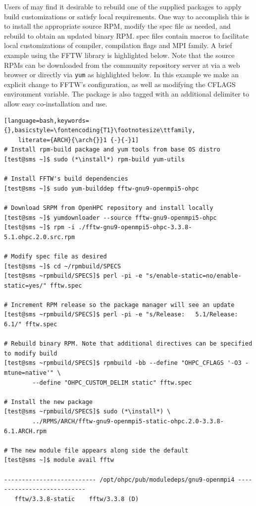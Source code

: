 Users of \OHPC{} may find it desirable to rebuild one of the supplied packages
to apply build customizations or satisfy local requirements. One way to
accomplish this is to install the appropriate source RPM, modify the spec file
as needed, and rebuild to obtain an updated binary RPM. \OHPC{} spec files
contain macros to facilitate local customizations of compiler, compilation
flags and MPI family. A brief example using
the FFTW library is highlighted below.  Note that the source RPMs can be downloaded from the
community repository server at \href{http://repos.openhpc.community}
{\color{blue}{http://repos.openhpc.community}} via a web browser or directly
via \texttt{yum} as highlighted below. In this example we make an explicit
change to FFTW's configuration, as well as modifying the CFLAGS environment
variable. The package is also tagged with an additional delimiter to allow easy
co-installation and use. 

\begin{lstlisting}[language=bash,keywords={},basicstyle=\fontencoding{T1}\footnotesize\ttfamily,
    literate={ARCH}{\arch{}}1 {-}{-}1]
# Install rpm-build package and yum tools from base OS distro
[test@sms ~]$ sudo (*\install*) rpm-build yum-utils

# Install FFTW's build dependencies
[test@sms ~]$ sudo yum-builddep fftw-gnu9-openmpi5-ohpc

# Download SRPM from OpenHPC repository and install locally
[test@sms ~]$ yumdownloader --source fftw-gnu9-openmpi5-ohpc
[test@sms ~]$ rpm -i ./fftw-gnu9-openmpi5-ohpc-3.3.8-5.1.ohpc.2.0.src.rpm

# Modify spec file as desired
[test@sms ~]$ cd ~/rpmbuild/SPECS
[test@sms ~rpmbuild/SPECS]$ perl -pi -e "s/enable-static=no/enable-static=yes/" fftw.spec

# Increment RPM release so the package manager will see an update
[test@sms ~rpmbuild/SPECS]$ perl -pi -e "s/Release:   5.1/Release:   6.1/" fftw.spec

# Rebuild binary RPM. Note that additional directives can be specified to modify build
[test@sms ~rpmbuild/SPECS]$ rpmbuild -bb --define "OHPC_CFLAGS '-O3 -mtune=native'" \
        --define "OHPC_CUSTOM_DELIM static" fftw.spec

# Install the new package
[test@sms ~rpmbuild/SPECS]$ sudo (*\install*) \
        ../RPMS/ARCH/fftw-gnu9-openmpi5-static-ohpc.2.0-3.3.8-6.1.ARCH.rpm

# The new module file appears along side the default
[test@sms ~]$ module avail fftw

-------------------------- /opt/ohpc/pub/moduledeps/gnu9-openmpi4 ---------------------------
   fftw/3.3.8-static    fftw/3.3.8 (D)
\end{lstlisting}
